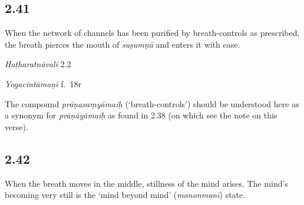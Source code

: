\begin{ekdosis}
\begin{philcomm}[hp02_040]
\end{philcomm}

\subsection*{2.41}
\begin{translation}[hp02_041]
When the network of channels has been purified by breath-controls as prescribed, the breath pierces the mouth of \emph{suṣumṇā} and enters it with ease.
\end{translation}


\begin{testimonia}[hp02_041]
\emph{Haṭharatnāvalī} 2.2

\begin{versinnote}
\end{versinnote}

\emph{Yogacintāmaṇi} f.~18r

\begin{versinnote}
\end{versinnote}


\end{testimonia}

\begin{philcomm}[hp02_041]
The compound \emph{prāṇasaṃyāmaiḥ} (‘breath-controls’) should be understood here as a synonym for \emph{prāṇāyāmaiḥ} as found in 2.38 (on which see the note on this verse).
\end{philcomm}

\subsection*{2.42}
\begin{translation}[hp02_042]
When the breath moves in the middle, stillness of the mind arises. The mind’s becoming very still is the ‘mind beyond mind’ (\emph{manonmanī}) state.
\end{translation}


\end{ekdosis}
